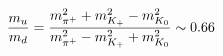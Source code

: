\begin{equation}
{m_u\over m_d}=
{
m_{\pi^+}^2+m_{K_+}^2-m_{K_0}^2\over
m_{\pi^+}^2-m_{K_+}^2+m_{K_0}^2}\sim 0.66
\end{equation}


